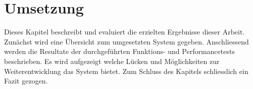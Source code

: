 \section{Umsetzung}

Dieses Kapitel beschreibt und evaluiert die erzielten Ergebnisse dieser Arbeit.
Zunächst wird eine Übersicht zum umgesetzten System gegeben.
Anschliessend werden die Resultate der durchgeführten Funktions- und Performancetests beschrieben.
Es wird aufgezeigt welche Lücken und Möglichkeiten zur Weiterentwicklung das System bietet.
Zum Schluss des Kapitels schliesslich ein Fazit gezogen.





\clearpage
